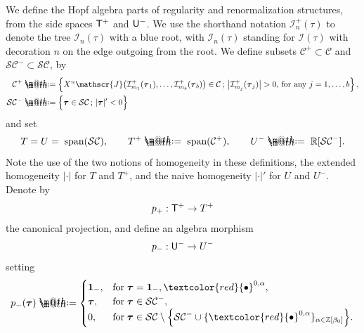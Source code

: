 \documentclass[10pt, reqno]{amsart}
\makeatletter
\numberwithin{subsection}{section}
\numberwithin{subsubsection}{subsection}
\numberwithin{equation}{section} %
\theoremstyle{mystyle}
\theoremstyle{mystyle2}
\theoremstyle{mystyle3}
\newcommand{\bstau}{\boldsymbol{\tau}}
\newcommand\bbR{\mathbb{R}}
\newcommand\bbZ{\mathbb{Z}}
\newcommand{\mcC}{\mathcal{C}}
\newcommand{\mcI}{\mathcal{I}}
\newcommand\mcS{\mathcal{S}}
\newcommand*{\defeq}{\mathrel{\rlap{%
                     \raisebox{0.3ex}{$\m@th\cdot$}}%
                     \raisebox{-0.3ex}{$\m@th\cdot$}}%
                     =}
\makeatother
\begin{document}
We define the Hopf algebra parts of regularity and renormalization structures, from the side spaces ${\sf T}^+$ and ${\sf U}^-$. We use the shorthand notation $\mcI^+_n(\tau)$ to denote the tree $\mcI_n(\tau)$ with a blue root, with $\mcI_n(\tau)$ standing for $\mcI(\tau)$ with decoration $n$ on the edge outgoing from the root. We define subsets $\mathcal{C}^+\subset \mathcal{C}$ and $\mathcal{SC}^-\subset \mathcal{SC}$, by
\begin{align*}
\mathcal{C}^+ &\defeq  \left\{X^n\mathscr{J}\big(\mcI_{m_1}^+(\bstau_1),\dots,\mcI_{m_b}^+(\bstau_b)\big)\in\mathcal{C} \,;\, \text{$\big\vert\mcI_{m_j}^+(\bstau_j)\big\vert > 0$, for any $j=1,\dots,b$}\right\},\\
\mathcal{SC}^-& \defeq  
\Big\{\bstau\in \mathcal{SC}\,;\, \vert\bstau\vert' < 0\Big\}
\end{align*}
and set
$$
T=U = \;\textrm{span}(\mcS\mcC),   \qquad
T^+ \defeq \;\text{\rm span}(\mathcal{C}^+),   \qquad
U^- \defeq \;\bbR[\mathcal{SC}^-].
$$
Note the use of the two notions of homogeneity in these definitions, the extended homogeneity $\vert\cdot\vert$ for $T$ and $T^+$, and the naive homogeneity $\vert\cdot\vert'$ for $U$ and $U^-$. Denote by 
$$
p_+ : {\sf T}^+\to T^+
$$
the canonical projection, and define an algebra morphism 
$$
p_- : {\sf U}^-\to U^-
$$ 
setting
\begin{align*}
p_-(\bstau) \defeq  
\begin{cases}
{\bf1}_-,   &\textrm{for}\;\bstau={\bf1}_-, \textcolor{red}{\bullet}^{0,\alpha},\\
\bstau,   &\textrm{for}\;\bstau\in\mathcal{SC}^-,\\
0,   &\textrm{for}\;\bstau\in\mcS\mathcal{C}\setminus\Big\{\mathcal{SC}^-\cup\{\textcolor{red}{\bullet}^{0,\alpha}\}_{\alpha\in\bbZ[\beta_0]}\Big\}.
\end{cases}
\end{align*}

\medskip
\end{document}
